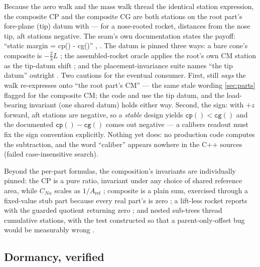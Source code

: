 \begin{designrule}
Because the aero walk and the mass walk thread the identical station expression, the
composite CP and the composite CG are both stations on the root part's fore-plane (tip)
datum with \zfwd{} --- for a nose-rooted rocket, distances from the nose tip, aft stations
negative. The seam's own documentation states the payoff: ``static margin = cp() - cg()''
, . The datum is pinned three ways: a bare
cone's composite  is $-\tfrac{2}{3}L$ ;
the assembled-rocket oracle applies the root's own CM station as the tip-datum shift
; and the placement-invariance suite names ``the tip
datum'' outright . Two cautions for the
eventual consumer. First,  still \emph{says} the walk re-expresses onto
``the root part's CM'' --- the same stale wording \cref{sec:parts} flagged for the composite
CM; the code and  use the tip datum, and the load-bearing
invariant (one shared datum) holds either way. Second, the sign: with $+z$ forward, aft
stations are negative, so a \emph{stable} design yields $\mathtt{cp()} < \mathtt{cg()}$ and
the documented $\mathtt{cp()} - \mathtt{cg()}$ comes out negative --- a calibers readout
must fix the sign convention explicitly. Nothing yet does: no production code computes the
subtraction, and the word ``caliber'' appears nowhere in the C++ sources (failed
case-insensitive search).
\end{designrule}

Beyond the per-part formulas, the composition's invariants are individually pinned: the CP
is a pure ratio, invariant under any choice of shared reference area, while $C_{N\alpha}$
scales as $1/A_{\mathrm{ref}}$ ; composite  is
a plain sum, exercised through a fixed-value stub part because every real part's is zero
; a lift-less rocket reports 
with the guarded quotient returning zero ; and nested
sub-trees thread cumulative stations, with the test constructed so that a
parent-only-offset bug would be measurably wrong .

\subsection{Dormancy, verified}\label{sec:aero-dormant}

